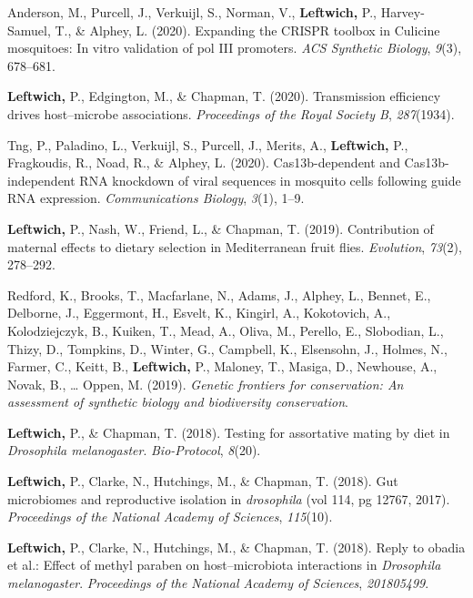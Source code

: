 \documentclass[11pt, a4paper]{awesome-cv}
\begin{document}
\leavevmode\hypertarget{ref-11}{}%
Anderson, M., Purcell, J., Verkuijl, S., Norman, V., \textbf{Leftwich,}
P., Harvey-Samuel, T., \& Alphey, L. (2020). Expanding the CRISPR
toolbox in {Culicine} mosquitoes: In vitro validation of pol III
promoters. \emph{ACS Synthetic Biology}, \emph{9}(3), 678--681.

\leavevmode\hypertarget{ref-14}{}%
\textbf{Leftwich,} P., Edgington, M., \& Chapman, T. (2020).
Transmission efficiency drives host--microbe associations.
\emph{Proceedings of the Royal Society B}, \emph{287}(1934).

\leavevmode\hypertarget{ref-16}{}%
Tng, P., Paladino, L., Verkuijl, S., Purcell, J., Merits, A.,
\textbf{Leftwich,} P., Fragkoudis, R., Noad, R., \& Alphey, L. (2020).
Cas13b-dependent and {Cas}13b-independent {RNA} knockdown of viral
sequences in mosquito cells following guide {RNA} expression.
\emph{Communications Biology}, \emph{3}(1), 1--9.

\leavevmode\hypertarget{ref-15}{}%
\textbf{Leftwich,} P., Nash, W., Friend, L., \& Chapman, T. (2019).
Contribution of maternal effects to dietary selection in {Mediterranean}
fruit flies. \emph{Evolution}, \emph{73}(2), 278--292.

\leavevmode\hypertarget{ref-6}{}%
Redford, K., Brooks, T., Macfarlane, N., Adams, J., Alphey, L., Bennet,
E., Delborne, J., Eggermont, H., Esvelt, K., Kingirl, A., Kokotovich,
A., Kolodziejczyk, B., Kuiken, T., Mead, A., Oliva, M., Perello, E.,
Slobodian, L., Thizy, D., Tompkins, D., Winter, G., Campbell, K.,
Elsensohn, J., Holmes, N., Farmer, C., Keitt, B., \textbf{Leftwich,} P.,
Maloney, T., Masiga, D., Newhouse, A., Novak, B., \ldots{} Oppen, M.
(2019). \emph{Genetic frontiers for conservation: An assessment of
synthetic biology and biodiversity conservation}.

\leavevmode\hypertarget{ref-17}{}%
\textbf{Leftwich,} P., \& Chapman, T. (2018). Testing for assortative
mating by diet in \emph{{Drosophila} melanogaster}. \emph{Bio-Protocol},
\emph{8}(20).

\leavevmode\hypertarget{ref-3}{}%
\textbf{Leftwich,} P., Clarke, N., Hutchings, M., \& Chapman, T. (2018).
Gut microbiomes and reproductive isolation in \emph{drosophila} (vol
114, pg 12767, 2017). \emph{Proceedings of the National Academy of
Sciences}, \emph{115}(10).

\leavevmode\hypertarget{ref-10}{}%
\textbf{Leftwich,} P., Clarke, N., Hutchings, M., \& Chapman, T. (2018).
Reply to obadia et al.: Effect of methyl paraben on host--microbiota
interactions in \emph{{Drosophila} melanogaster}. \emph{Proceedings of
the National Academy of Sciences}, \emph{201805499}.
\end{document}
